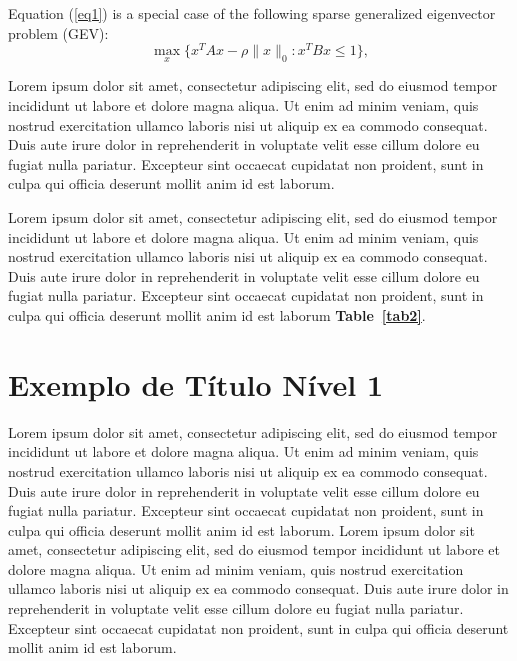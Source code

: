 \documentclass[portuguese]{sbc2025}%
\begin{document}
Equation (\ref{eq1}) is a special case of the following sparse generalized eigenvector problem (GEV):
\begin{equation}\label{GEV}
\max\limits_{x}\{x^TAx-\rho \|x\|_0: x^TBx\leq 1\},
\end{equation}

Lorem ipsum dolor sit amet, consectetur adipiscing elit, sed do eiusmod tempor incididunt ut labore et dolore magna aliqua. Ut enim ad minim veniam, quis nostrud exercitation ullamco laboris nisi ut aliquip ex ea commodo consequat. Duis aute irure dolor in reprehenderit in voluptate velit esse cillum dolore eu fugiat nulla pariatur. Excepteur sint occaecat cupidatat non proident, sunt in culpa qui officia deserunt mollit anim id est laborum. 

Lorem ipsum dolor sit amet, consectetur adipiscing elit, sed do eiusmod tempor incididunt ut labore et dolore magna aliqua. Ut enim ad minim veniam, quis nostrud exercitation ullamco laboris nisi ut aliquip ex ea commodo consequat. Duis aute irure dolor in reprehenderit in voluptate velit esse cillum dolore eu fugiat nulla pariatur. Excepteur sint occaecat cupidatat non proident, sunt in culpa qui officia deserunt mollit anim id est laborum \textbf{Table~\ref{tab2}}.

\section{Exemplo de Título Nível 1}

Lorem ipsum dolor sit amet, consectetur adipiscing elit, sed do eiusmod tempor incididunt ut labore et dolore magna aliqua. Ut enim ad minim veniam, quis nostrud exercitation ullamco laboris nisi ut aliquip ex ea commodo consequat. Duis aute irure dolor in reprehenderit in voluptate velit esse cillum dolore eu fugiat nulla pariatur. Excepteur sint occaecat cupidatat non proident, sunt in culpa qui officia deserunt mollit anim id est laborum. Lorem ipsum dolor sit amet, consectetur adipiscing elit, sed do eiusmod tempor incididunt ut labore et dolore magna aliqua. Ut enim ad minim veniam, quis nostrud exercitation ullamco laboris nisi ut aliquip ex ea commodo consequat. Duis aute irure dolor in reprehenderit in voluptate velit esse cillum dolore eu fugiat nulla pariatur. Excepteur sint occaecat cupidatat non proident, sunt in culpa qui officia deserunt mollit anim id est laborum.
\end{document}
